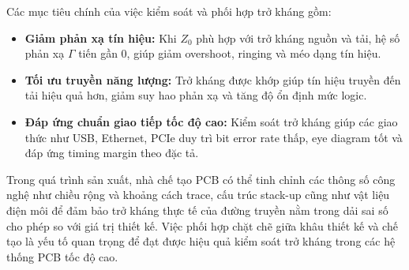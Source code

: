 
                        Các mục tiêu chính của việc kiểm soát và phối hợp trở kháng gồm:
                        \begin{itemize}
                            \item \textbf{Giảm phản xạ tín hiệu:} Khi \(Z_0\) phù hợp với trở kháng nguồn và tải, hệ số phản xạ \(\Gamma\) tiến gần 0, giúp giảm overshoot, ringing và méo dạng tín hiệu.
                            \item \textbf{Tối ưu truyền năng lượng:} Trở kháng được khớp giúp tín hiệu truyền đến tải hiệu quả hơn, giảm suy hao phản xạ và tăng độ ổn định mức logic.
                            \item \textbf{Đáp ứng chuẩn giao tiếp tốc độ cao:} Kiểm soát trở kháng giúp các giao thức như USB, Ethernet, PCIe duy trì bit error rate thấp, eye diagram tốt và đáp ứng timing margin theo đặc tả.
                        \end{itemize}
                                                
                        Trong quá trình sản xuất, nhà chế tạo PCB có thể tinh chỉnh các thông số công nghệ như chiều rộng và khoảng cách trace, cấu trúc stack-up cũng như vật liệu điện môi để đảm bảo trở kháng thực tế của đường truyền nằm trong dải sai số cho phép so với giá trị thiết kế. Việc phối hợp chặt chẽ giữa khâu thiết kế và chế tạo là yếu tố quan trọng để đạt được hiệu quả kiểm soát trở kháng trong các hệ thống PCB tốc độ cao.
                        
